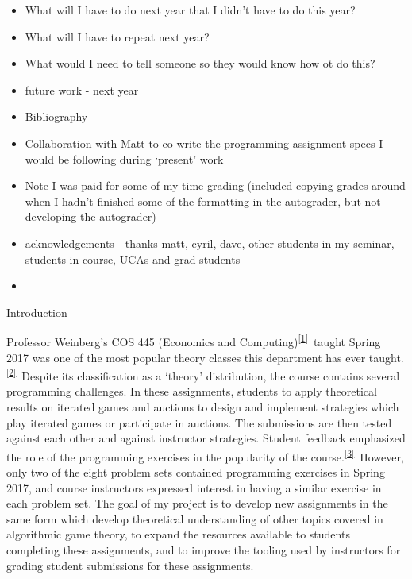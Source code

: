 \documentclass[]{article}
\providecommand{\tightlist}{%
  \setlength{\itemsep}{0pt}\setlength{\parskip}{0pt}}
\begin{document}
\begin{itemize}
\tightlist
\item
  {What will I have to do next year that I didn't have to do this year?}
\item
  {What will I have to repeat next year?}
\item
  {What would I need to tell someone so they would know how ot do this?}
\item
  {future work - next year}
\end{itemize}

\begin{itemize}
\tightlist
\item
  {Bibliography}
\end{itemize}

\begin{itemize}
\tightlist
\item
  {Collaboration with Matt to co-write the programming assignment specs
  I would be following during `present' work}
\item
  {Note I was paid for some of my time grading (included copying grades
  around when I hadn't finished some of the formatting in the
  autograder, but not developing the autograder)}
\item
  {acknowledgements - thanks matt, cyril, dave, other students in my
  seminar, students in course, UCAs and grad students}
\end{itemize}

\begin{itemize}
\tightlist
\item
  {}
\end{itemize}

{}

{Introduction~~~~~~~~}

{Professor Weinberg's COS 445 (Economics and
Computing)}\textsuperscript{\protect\hyperlink{ftnt1}{{[}1{]}}}{~taught
Spring 2017 was one of the most popular theory classes this department
has ever
taught.}\textsuperscript{\protect\hyperlink{ftnt2}{{[}2{]}}}{~Despite
its classification as a `theory' distribution, the course contains
several programming challenges. In these assignments, students to apply
theoretical results on iterated games and auctions to design and
implement strategies which play iterated games or participate in
auctions. The submissions are then tested against each other and against
instructor strategies. Student feedback emphasized the role of the
programming exercises in the popularity of the
course.}\textsuperscript{\protect\hyperlink{ftnt3}{{[}3{]}}}{~However,
only two of the eight problem sets contained programming exercises in
Spring 2017, and course instructors expressed interest in having a
similar exercise in each problem set. The goal of my project is to
develop new assignments in the same form which develop theoretical
understanding of other topics covered in algorithmic game theory, to
expand the resources available to students completing these assignments,
and to improve the tooling used by instructors for grading student
submissions for these assignments. }
\end{document}
